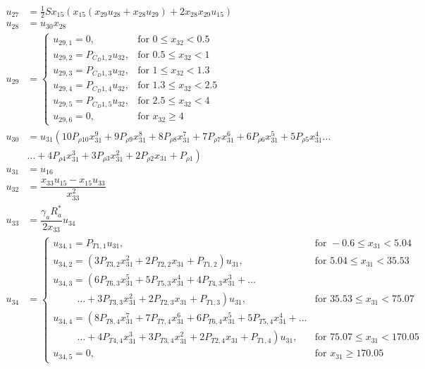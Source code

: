 \begin{equation} \label{eq:unAuxEq3}
\begin{split}
u_{27} &=  \frac{1}{2}Sx_{15}\left(x_{15} \left(x_{29}u_{28}+x_{28}u_{29}\right)+2x_{28}x_{29}u_{15}\right) \\
u_{28} &= u_{30}x_{28} \\
u_{29} &=\begin{cases}
u_{29,1}=0, & \text{for } 0\leq x_{32} < 0.5\\
u_{29,2}=P_{C_{D} 1,2}u_{32}, &  \text{for } 0.5\leq x_{32} < 1 \\
u_{29,3}=P_{C_{D} 1,3}u_{32}, &  \text{for } 1\leq x_{32} < 1.3 \\
u_{29,4}=P_{C_{D} 1,4}u_{32}, &  \text{for } 1.3\leq x_{32} < 2.5 \\
u_{29,5}=P_{C_{D} 1,5}u_{32}, &  \text{for } 2.5\leq x_{32} < 4 \\
u_{29,6}=0, &  \text{for } x_{32} \geq 4 
\end{cases}\\
u_{30} &=u_{31} \left(10 P_{\rho 10}x_{31}^{9}+9 P_{\rho 9}x_{31}^{8}+8 P_{\rho 8}x_{31}^{7}+7 P_{\rho 7}x_{31}^{6}+6 P_{\rho 6}x_{31}^{5}+5 P_{\rho 5}x_{31}^{4}\dots \right. \\
& \left. \dotsc +4 P_{\rho 4}x_{31}^{3}+3 P_{\rho 3}x_{31}^{2}+2 P_{\rho 2}x_{31}+P_{\rho 1}\right) \\
u_{31} &= u_{16}\\
u_{32} &= \dfrac{x_{33}u_{15}-x_{15}u_{33}}{x_{33}^{2}}\\
u_{33} &= \dfrac{\gamma_{a}R_{a}^{*}}{2x_{33}}u_{34} \\
u_{34}&=\begin{cases}
u_{34,1}=P_{T 1,1}u_{31}, & \text{for } -0.6 \leq x_{31} < 5.04  \\
u_{34,2}=\left(3P_{T 3,2}x_{31}^{2}+2P_{T 2,2}x_{31}+P_{T 1,2}\right)u_{31}, &  \text{for } 5.04\leq x_{31} < 35.53   \\
u_{34,3}=\left(6 P_{T 6,3}x_{31}^{5}+5P_{T 5,3}x_{31}^{4}+4P_{T 4,3}x_{31}^{3}+\dots \right. \\
\qquad \ \  \left. \dotsc +3P_{T 3,3}x_{31}^{2}+2P_{T 2,3}x_{31}+P_{T 1,3}\right)u_{31}, &  \text{for } 35.53\leq x_{31} < 75.07   \\
u_{34,4}=\left(8 P_{T 8,4}x_{31}^{7}+7P_{T 7,4}x_{31}^{6}+6P_{T 6,4}x_{31}^{5}+5P_{T 5,4}x_{31}^{4} + \dots \right. \\
\qquad \ \  \left. \dotsc +4P_{T 4,4}x_{31}^{3}+3P_{T 3,4}x_{31}^{2}+2P_{T 2,4}x_{31}+P_{T 1,4}\right)u_{31}, &  \text{for } 75.07\leq x_{31} < 170.05   \\
u_{34,5}=0, &  \text{for }  x_{31} \geq 170.05   
\end{cases}
\end{split}
\end{equation}





